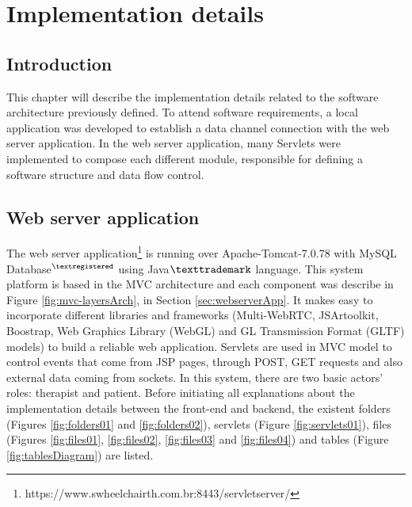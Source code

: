 \chapter{Implementation details}

\section{Introduction}
This chapter will describe the implementation details related to the software architecture previously defined. To attend software requirements, a local application was developed to establish a data channel connection with the web server application. In the web server application, many Servlets were implemented to compose each different module, responsible for defining a software structure and data flow control.

\section{Web server application}
\label{sec:implwebserver}


The web server application\footnote{https://www.swheelchairth.com.br:8443/servletserver/} is running over Apache-Tomcat-7.0.78 with MySQL Database$^{\textregistered}$ using Java$\texttrademark$ language. This system platform is based in the MVC architecture and each component was describe in Figure \ref{fig:mvc-layersArch}, in Section \ref{sec:webserverApp}. It makes easy to incorporate different libraries and frameworks (Multi-WebRTC, JSArtoolkit, Boostrap, Web Graphics Library (WebGL) and GL Transmission Format (GLTF) models) to build a reliable web application. Servlets are used in MVC model to control events that come from JSP pages, through POST, GET requests and also external data coming from sockets. In this system, there are two basic actors' roles: therapist and patient. Before initiating all explanations about the implementation details between the front-end and backend, the existent folders (Figures \ref{fig:folders01} and \ref{fig:folders02}), servlets (Figure \ref{fig:servlets01}), files (Figures \ref{fig:files01}, \ref{fig:files02}, \ref{fig:files03} and \ref{fig:files04}) and tables (Figure \ref{fig:tablesDiagram}) are listed.  

